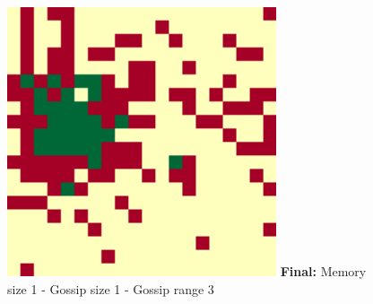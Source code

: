 \documentclass[english]{article}
\begin{document}
\begin{figure}[!hb]
{    \includegraphics[width=\textwidth/4]{spatial-memory0+gossip0+range0-C.pdf}
  }
  \textbf{Final:} Memory size 1 - Gossip size 1 - Gossip range 3
\end{figure}
\end{document}
